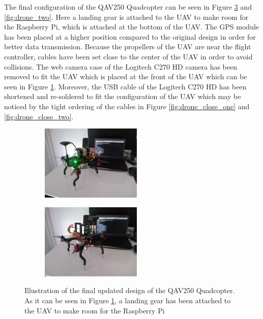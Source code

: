 \documentclass[../Head/report.tex]{subfiles}
\begin{document}
The final configuration of the QAV250 Quadcopter can be seen in Figure \ref{fig:drone_one} and \ref{fig:drone_two}. Here a landing gear is attached to the UAV to make room for the Raspberry Pi, which is attached at the bottom of the UAV. The GPS module has been placed at a higher position compared to the original design in order for better data transmission. Because the propellers of the UAV are near the flight controller, cables have been set close to the center of the UAV in order to avoid collisions. The web camera case of the Logitech C270 HD camera has been removed to fit the UAV which is placed at the front of the UAV which can be seen in Figure \ref{fig:drone_front}. Moreover, the USB cable of the Logitech C270 HD has been shortened and re-soldered to fit the configuration of the UAV which may be noticed by the tight ordering of the cables in Figure \ref{fig:drone_close_one} and \ref{fig:drone_close_two}.    

\begin{figure}[H]
    \centering
    \begin{subfigure}[b]{.33\textwidth}
        \centering
        \includegraphics[height=3.6cm]{../Figures/drone/drone_front.jpg}
        \caption{}
        \label{fig:drone_front}
    \end{subfigure}
    \begin{subfigure}[b]{.33\textwidth}
        \centering
        \includegraphics[height=3.6cm]{../Figures/drone/drone_front2.jpg}
        \caption{}
        \label{fig:drone_bottom_zoom}
    \end{subfigure}
    \caption{Illustration of the final updated design of the QAV250 Quadcopter. As it can be seen in Figure \ref{fig:drone_front}, a landing gear has been attached to the UAV to make room for the Raspberry Pi}
    \label{fig:drone_one}
\end{figure}
\end{document}
